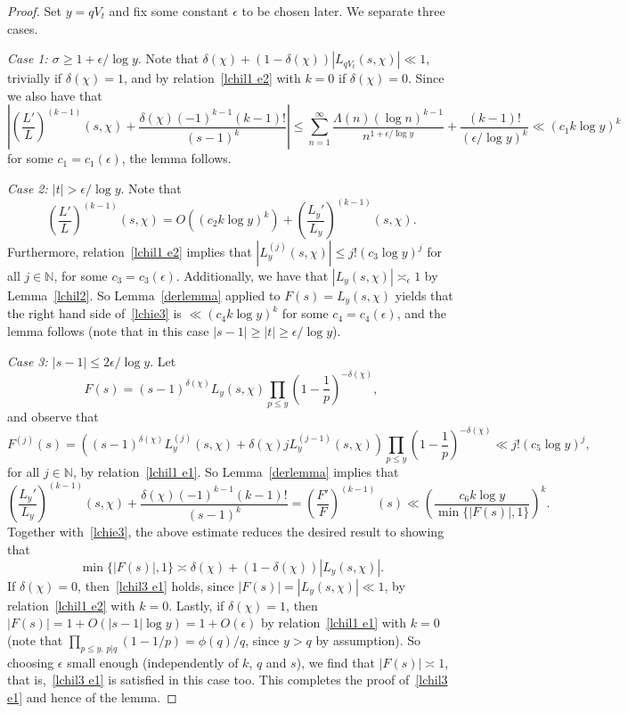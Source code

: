 \documentclass[12pt]{amsart}
\theoremstyle{remark}
\newcommand {\SN} {{\mathbb N}}
\newcommand{\be}{\begin{equation}}
\newcommand{\ee}{\end{equation}}
\numberwithin{equation}{section}
\begin{document}
\begin{proof} Set $y=qV_t$ and fix some constant $\epsilon$ to be chosen later. We separate three cases.

\medskip

\textit{Case 1: $\sigma\ge1+\epsilon/\log y$}. Note that $\delta(\chi)+(1-\delta(\chi))|L_{qV_t}(s,\chi)|\ll1$, trivially if $\delta(\chi)=1$, and by relation~\eqref{lchil1 e2} with $k=0$ if $\delta(\chi)=0$. Since we also have that
$$
\left|\left(\frac{L'}{L}\right)^{(k-1)}(s,\chi)+\frac{\delta(\chi)(-1)^{k-1}(k-1)!}{(s-1)^k}\right|
\le\sum_{n=1}^\infty\frac{\Lambda(n)(\log n)^{k-1}}{n^{1+\epsilon/\log y} }+\frac{(k-1)!}{(\epsilon/\log y)^k} \ll (c_1k\log y)^k
$$
for some $c_1=c_1(\epsilon)$, the lemma follows.

\medskip

\textit{Case 2: $|t|>\epsilon/\log y$}. Note that
\be\label{lchie3}
\left(\frac{L'}{L}\right)^{(k-1)}(s,\chi) = O\left((c_2k\log y)^k\right) + \left(\frac{L_y'}{L_y}\right)^{(k-1)}(s,\chi).
\ee
Furthermore, relation~\eqref{lchil1 e2} implies that $|L_y^{(j)}(s,\chi)|\le j!(c_3\log y)^j$ for all $j\in\SN$, for some $c_3=c_3(\epsilon)$. Additionally, we have that $|L_y(s,\chi)|\asymp_\epsilon1$ by Lemma~\ref{lchil2}. So Lemma~\ref{derlemma} applied to $F(s)=L_y(s,\chi)$ yields that the right hand side
of~\eqref{lchie3} is $\ll(c_4k\log y)^k$ for some $c_4=c_4(\epsilon)$, and the lemma follows (note that in this case $|s-1|\ge |t|\ge \epsilon/ \log y$).

\medskip

\textit{Case 3: $|s-1|\le2\epsilon/\log y$}. Let
$$
F(s)=(s-1)^{\delta(\chi)}L_y(s,\chi)\prod_{p\le y}\left(1-\frac1p\right)^{-\delta(\chi)},
$$
and observe that
$$
F^{(j)}(s) = \left( (s-1)^{\delta(\chi)} L_y^{(j)}(s,\chi) + \delta(\chi) j L_y^{(j-1)}(s,\chi) \right) \prod_{p\le y} \left( 1- \frac1p\right)^{-\delta(\chi)} \ll j!(c_5\log y)^j,
$$
for all $j\in\SN$, by relation~\eqref{lchil1 e1}. So Lemma~\ref{derlemma} implies that
$$
\left(\frac{L_y'}{L_y}\right)^{(k-1)}(s,\chi) + \frac{\delta(\chi)(-1)^{k-1}(k-1)!}{(s-1)^k} = \left(\frac{F'}{F}\right)^{(k-1)}(s) \ll \left(\frac{c_6k\log y}{\min\{|F(s)|,1\}}\right)^k.
$$
Together with~\eqref{lchie3}, the above estimate reduces the desired result to showing that
\be\label{lchil3 e1}\min\{|F(s)|,1\}\asymp\delta(\chi)+(1-\delta(\chi))|L_y(s,\chi)|.
\ee
If $\delta(\chi)=0$, then~\eqref{lchil3 e1} holds, since $|F(s)|=|L_{y}(s,\chi)|\ll1$, by relation~\eqref{lchil1 e2} with $k=0$. Lastly, if $\delta(\chi)=1$, then $|F(s)|=1+O(|s-1|\log y)=1+O(\epsilon)$ by relation~\eqref{lchil1 e1} with $k=0$ (note that $\prod_{p\le y,\,p|q}(1-1/p)=\phi(q)/q$, since $y>q$ by assumption). So choosing $\epsilon$ small enough (independently of $k$, $q$ and $s$), we find that $|F(s)|\asymp1$, that is,~\eqref{lchil3 e1} is satisfied in this case too. This completes the proof of~\eqref{lchil3 e1} and hence of the lemma.
\end{proof}
\end{document}
